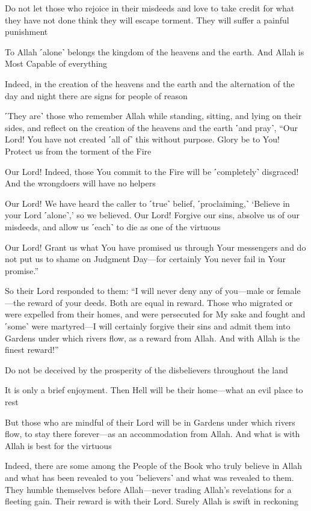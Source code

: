 Do not let those who rejoice in their misdeeds and love to take credit for what they have not done think they will escape torment. They will suffer a painful punishment

To Allah ˹alone˺ belongs the kingdom of the heavens and the earth. And Allah is Most Capable of everything

Indeed, in the creation of the heavens and the earth and the alternation of the day and night there are signs for people of reason

˹They are˺ those who remember Allah while standing, sitting, and lying on their sides, and reflect on the creation of the heavens and the earth ˹and pray˺, “Our Lord! You have not created ˹all of˺ this without purpose. Glory be to You! Protect us from the torment of the Fire

Our Lord! Indeed, those You commit to the Fire will be ˹completely˺ disgraced! And the wrongdoers will have no helpers

Our Lord! We have heard the caller to ˹true˺ belief, ˹proclaiming,˺ ‘Believe in your Lord ˹alone˺,’ so we believed. Our Lord! Forgive our sins, absolve us of our misdeeds, and allow us ˹each˺ to die as one of the virtuous

Our Lord! Grant us what You have promised us through Your messengers and do not put us to shame on Judgment Day—for certainly You never fail in Your promise.”

So their Lord responded to them: “I will never deny any of you—male or female—the reward of your deeds. Both are equal in reward. Those who migrated or were expelled from their homes, and were persecuted for My sake and fought and ˹some˺ were martyred—I will certainly forgive their sins and admit them into Gardens under which rivers flow, as a reward from Allah. And with Allah is the finest reward!”

Do not be deceived by the prosperity of the disbelievers throughout the land

It is only a brief enjoyment. Then Hell will be their home—what an evil place to rest

But those who are mindful of their Lord will be in Gardens under which rivers flow, to stay there forever—as an accommodation from Allah. And what is with Allah is best for the virtuous

Indeed, there are some among the People of the Book who truly believe in Allah and what has been revealed to you ˹believers˺ and what was revealed to them. They humble themselves before Allah—never trading Allah’s revelations for a fleeting gain. Their reward is with their Lord. Surely Allah is swift in reckoning

